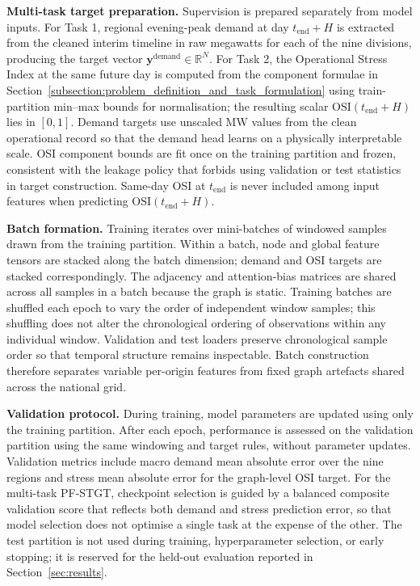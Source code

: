 \textbf{Multi-task target preparation.} Supervision is prepared separately from model inputs. For Task 1, regional evening-peak demand at day \(t_{\mathrm{end}} + H\) is extracted from the cleaned interim timeline in raw megawatts for each of the nine divisions, producing the target vector \(\mathbf{y}^{\mathrm{demand}} \in \mathbb{R}^N\). For Task 2, the Operational Stress Index at the same future day is computed from the component formulae in Section~\ref{subsection:problem_definition_and_task_formulation} using train-partition min--max bounds for normalisation; the resulting scalar \(\mathrm{OSI}(t_{\mathrm{end}} + H)\) lies in \([0, 1]\). Demand targets use unscaled MW values from the clean operational record so that the demand head learns on a physically interpretable scale. OSI component bounds are fit once on the training partition and frozen, consistent with the leakage policy that forbids using validation or test statistics in target construction. Same-day OSI at \(t_{\mathrm{end}}\) is never included among input features when predicting \(\mathrm{OSI}(t_{\mathrm{end}} + H)\).

\textbf{Batch formation.} Training iterates over mini-batches of windowed samples drawn from the training partition. Within a batch, node and global feature tensors are stacked along the batch dimension; demand and OSI targets are stacked correspondingly. The adjacency and attention-bias matrices are shared across all samples in a batch because the graph is static. Training batches are shuffled each epoch to vary the order of independent window samples; this shuffling does not alter the chronological ordering of observations within any individual window. Validation and test loaders preserve chronological sample order so that temporal structure remains inspectable. Batch construction therefore separates variable per-origin features from fixed graph artefacts shared across the national grid.

\textbf{Validation protocol.} During training, model parameters are updated using only the training partition. After each epoch, performance is assessed on the validation partition using the same windowing and target rules, without parameter updates. Validation metrics include macro demand mean absolute error over the nine regions and stress mean absolute error for the graph-level OSI target. For the multi-task PF-STGT, checkpoint selection is guided by a balanced composite validation score that reflects both demand and stress prediction error, so that model selection does not optimise a single task at the expense of the other. The test partition is not used during training, hyperparameter selection, or early stopping; it is reserved for the held-out evaluation reported in Section~\ref{sec:results}.

